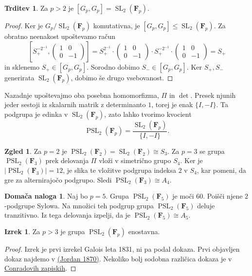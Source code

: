 \documentclass[11pt]{book}
\def\FF{\mathbf{F}}
\DeclareMathOperator\SL{SL}
\DeclareMathOperator\PSL{PSL}
\theoremstyle{definition}
\theoremstyle{zgled}
\newtheorem{zgled}[theorem]{Zgled}
\theoremstyle{zgledbrezstevilke}
\theoremstyle{odprtproblem}
\theoremstyle{domacanaloga}
\newtheorem{domacanaloga}[theorem]{Domača naloga}
\newenvironment{dokaz}
    {\color{siva}\begin{proof}}
    {\end{proof}}
\theoremstyle{izrek}
\newtheorem{izrek}[theorem]{Izrek}
\newtheorem{trditev}[theorem]{Trditev}
\begin{document}
\begin{trditev}
Za $p > 2$ je $[G_p, G_p] = \SL_2(\FF_p)$.
\end{trditev}
\begin{dokaz}
Ker je $G_p/\SL_2(\FF_p)$ komutativna, je $[G_p,G_p] \leq \SL_2(\FF_p)$. Za obratno neenakost upoštevamo račun
\[
    \left[ 
        S_+^{-2^{-1}}, 
        \begin{pmatrix}
            1 & 0 \\ 0 & -1 
        \end{pmatrix}
    \right] =
    S_+^{2^{-1}} \cdot 
    \begin{pmatrix}
        1 & 0 \\ 0 & -1 
    \end{pmatrix}
    \cdot S_+^{-2^{-1}} \cdot
    \begin{pmatrix}
        1 & 0 \\ 0 & -1 
    \end{pmatrix}
    = S_+
\]
in sklenemo $S_+ \in [G_p, G_p]$. Sorodno dobimo $S_- \in [G_p, G_p]$. Ker $S_+,S_-$ generirata $\SL_2(\FF_p)$, dobimo še drugo vsebovanost.
\end{dokaz} 

Nazadnje upoštevajmo oba posebna homomorfizma, $\Pi$ in $\det$. Presek njunih jeder sestoji iz skalarnih matrik z determinanto $1$, torej je enak $\{ I, -I \}$. Ta podgrupa je edinka v $\SL_2(\FF_p)$, zato lahko tvorimo kvocient
\[
    {\textstyle \PSL_2(\FF_p)} = \frac{\SL_2(\FF_p)}{\{ I, -I \}}.
\]

\begin{zgled}
Za $p = 2$ je $\PSL_2(\FF_2) = \SL_2(\FF_2) \cong S_3$. Za $p = 3$ se grupa $\PSL_2(\FF_3)$ prek delovanja $\Pi$ vloži v simetrično grupo $S_4$. Ker je $|\PSL_2(\FF_3)| = 12$, je slika te vložitve podgrupa indeksa $2$ v $S_4$, kar pomeni, da gre za alternirajočo podgrupo. Sledi $\PSL_2(\FF_3) \cong A_4$.
\end{zgled}

\begin{domacanaloga}
Naj bo $p = 5$. Grupa $\PSL_2(\FF_5)$ je moči $60$. Poišči njene $2$-podgrupe Sylowa. Na množici teh podgrup grupa $\PSL_2(\FF_5)$ deluje tranzitivno. Iz tega delovanja izpelji, da je $\PSL_2(\FF_5) \cong A_5$. 
\end{domacanaloga}

\begin{izrek}
Za $p > 3$ je grupa $\PSL_2(\FF_p)$ enostavna.
\end{izrek}
\begin{dokaz}
Izrek je prvi izrekel Galois leta 1831, ni pa podal dokaza. Prvi objavljen dokaz najdemo v \href{https://archive.org/details/traitdessubsti00jorduoft/page/n15/mode/2up}{(Jordan 1870)}. Nekoliko bolj sodobna različica dokaza je v \href{https://kconrad.math.uconn.edu/blurbs/grouptheory/PSLnsimple.pdf}{Conradovih zapiskih}.
\end{dokaz}
\end{document}
